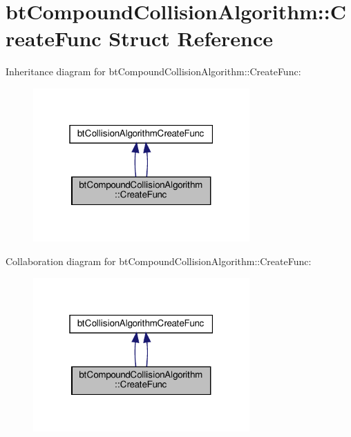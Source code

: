 \hypertarget{structbtCompoundCollisionAlgorithm_1_1CreateFunc}{}\section{bt\+Compound\+Collision\+Algorithm\+:\+:Create\+Func Struct Reference}
\label{structbtCompoundCollisionAlgorithm_1_1CreateFunc}


Inheritance diagram for bt\+Compound\+Collision\+Algorithm\+:\+:Create\+Func\+:
\nopagebreak
\begin{figure}[H]
\begin{center}
\leavevmode
\includegraphics[width=235pt]{structbtCompoundCollisionAlgorithm_1_1CreateFunc__inherit__graph}
\end{center}
\end{figure}


Collaboration diagram for bt\+Compound\+Collision\+Algorithm\+:\+:Create\+Func\+:
\nopagebreak
\begin{figure}[H]
\begin{center}
\leavevmode
\includegraphics[width=235pt]{structbtCompoundCollisionAlgorithm_1_1CreateFunc__coll__graph}
\end{center}
\end{figure}
